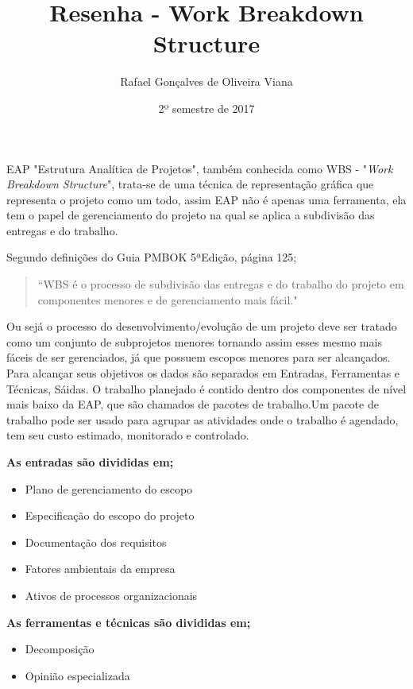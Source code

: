 \documentclass[12pt]{article}
\title{Resenha - Work Breakdown Structure}
\author{Rafael Gonçalves de  Oliveira Viana}
\date{2º semestre de 2017}
\begin{document}
\maketitle
EAP "Estrutura Analítica de Projetos", também conhecida como WBS - "\textit{Work Breakdown Structure}", trata-se de uma técnica de representação gráfica que representa o projeto como um todo, assim EAP não é apenas uma ferramenta, ela tem o papel de gerenciamento do projeto na qual se aplica a subdivisão das entregas e do trabalho.
 
Segundo definições do Guia PMBOK 5ªEdição, página 125;

 \begin{quote}
“WBS é o processo de subdivisão das entregas e do trabalho do projeto em componentes menores e de gerenciamento mais fácil."
\end{quote}

Ou sejá o processo  do desenvolvimento/evolução de um projeto deve ser tratado como um conjunto de subprojetos menores tornando assim esses mesmo mais fáceis de ser gerenciados, já que possuem escopos menores para ser alcançados.
Para alcançar seus objetivos os dados são separados em Entradas, Ferramentas e Técnicas, Sáidas.
O trabalho planejado é contido dentro dos componentes de nível mais baixo da EAP, que são chamados
de pacotes de trabalho.Um pacote de trabalho pode ser usado para agrupar as atividades onde o trabalho
é agendado, tem seu custo estimado, monitorado e controlado.

\textbf{As entradas são divididas em;}
	\begin{itemize}
		\begin{itemize}
		\item
		Plano de gerenciamento do escopo
		
		\item
		Especificação do escopo do projeto
		
		\item
		Documentação dos requisitos
		
		\item
		Fatores ambientais da empresa
		
		\item
		Ativos de processos organizacionais
	\end{itemize}
	\end{itemize}

\textbf{As ferramentas e técnicas são divididas em;}
	\begin{itemize}
	\begin{itemize}
		\item
		Decomposição
		
		\item
		Opinião especializada
		
		\end{itemize}
	\end{itemize}
\end{document}
